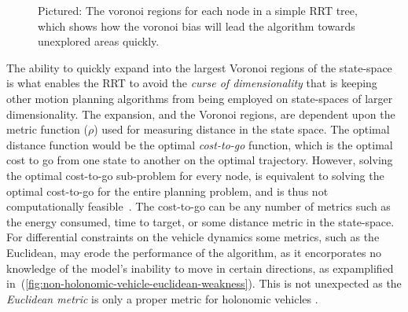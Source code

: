 \begin{figure}
  \centering
  \caption{Pictured: The voronoi regions for each node in a simple RRT tree,
    which shows how the voronoi bias will lead the algorithm towards unexplored
    areas quickly.}
  \label{fig:rrt-voronoi}
\end{figure}

The ability to quickly expand into the largest Voronoi regions of the
state-space is what enables the \ac{RRT} to avoid the \textit{curse of
  dimensionality} that is keeping other motion planning algorithms from being
employed on state-spaces of larger dimensionality. The expansion, and the
Voronoi regions, are dependent upon the metric function (\(\rho\)) used for
measuring distance in the state space. The optimal distance function would be
the optimal \textit{cost-to-go} function, which is the optimal cost to go from
one state to another on the optimal trajectory. However, solving the optimal
cost-to-go sub-problem for every node, is equivalent to solving the optimal
cost-to-go for the entire planning problem, and is thus not computationally
feasible~\cite{Lav06}. The cost-to-go can be any number of metrics such as the
energy consumed, time to target, or some distance metric in the state-space. For
differential constraints on the vehicle dynamics some metrics, such as the
Euclidean, may erode the performance of the algorithm, as it encorporates no
knowledge of the model's inability to move in certain directions, as
expamplified in~(\ref{fig:non-holonomic-vehicle-euclidean-weakness}). This is
not unexpected as the \textit{Euclidean metric} is only a proper metric for
holonomic vehicles \cite{parkFeedbackMotionPlanning2015}.

